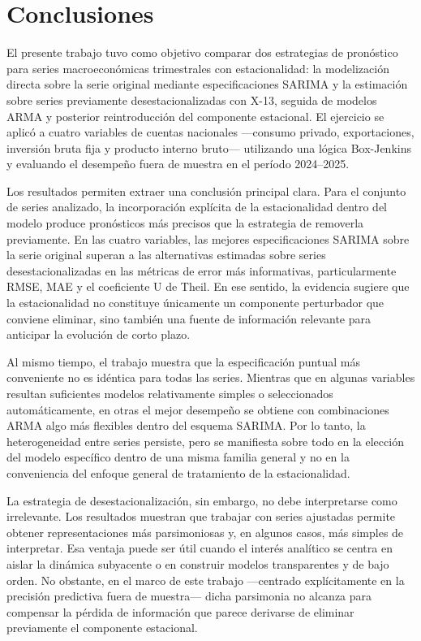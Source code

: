 \documentclass[11pt]{article}
\begin{document}
\section{Conclusiones}

El presente trabajo tuvo como objetivo comparar dos estrategias de pronóstico para series macroeconómicas trimestrales con estacionalidad: la modelización directa sobre la serie original mediante especificaciones SARIMA y la estimación sobre series previamente desestacionalizadas con X-13, seguida de modelos ARMA y posterior reintroducción del componente estacional. El ejercicio se aplicó a cuatro variables de cuentas nacionales ---consumo privado, exportaciones, inversión bruta fija y producto interno bruto--- utilizando una lógica Box-Jenkins y evaluando el desempeño fuera de muestra en el período 2024--2025.

Los resultados permiten extraer una conclusión principal clara. Para el conjunto de series analizado, la incorporación explícita de la estacionalidad dentro del modelo produce pronósticos más precisos que la estrategia de removerla previamente. En las cuatro variables, las mejores especificaciones SARIMA sobre la serie original superan a las alternativas estimadas sobre series desestacionalizadas en las métricas de error más informativas, particularmente RMSE, MAE y el coeficiente U de Theil. En ese sentido, la evidencia sugiere que la estacionalidad no constituye únicamente un componente perturbador que conviene eliminar, sino también una fuente de información relevante para anticipar la evolución de corto plazo.

Al mismo tiempo, el trabajo muestra que la especificación puntual más conveniente no es idéntica para todas las series. Mientras que en algunas variables resultan suficientes modelos relativamente simples o seleccionados automáticamente, en otras el mejor desempeño se obtiene con combinaciones ARMA algo más flexibles dentro del esquema SARIMA. Por lo tanto, la heterogeneidad entre series persiste, pero se manifiesta sobre todo en la elección del modelo específico dentro de una misma familia general y no en la conveniencia del enfoque general de tratamiento de la estacionalidad.

La estrategia de desestacionalización, sin embargo, no debe interpretarse como irrelevante. Los resultados muestran que trabajar con series ajustadas permite obtener representaciones más parsimoniosas y, en algunos casos, más simples de interpretar. Esa ventaja puede ser útil cuando el interés analítico se centra en aislar la dinámica subyacente o en construir modelos transparentes y de bajo orden. No obstante, en el marco de este trabajo ---centrado explícitamente en la precisión predictiva fuera de muestra--- dicha parsimonia no alcanza para compensar la pérdida de información que parece derivarse de eliminar previamente el componente estacional.
\end{document}
